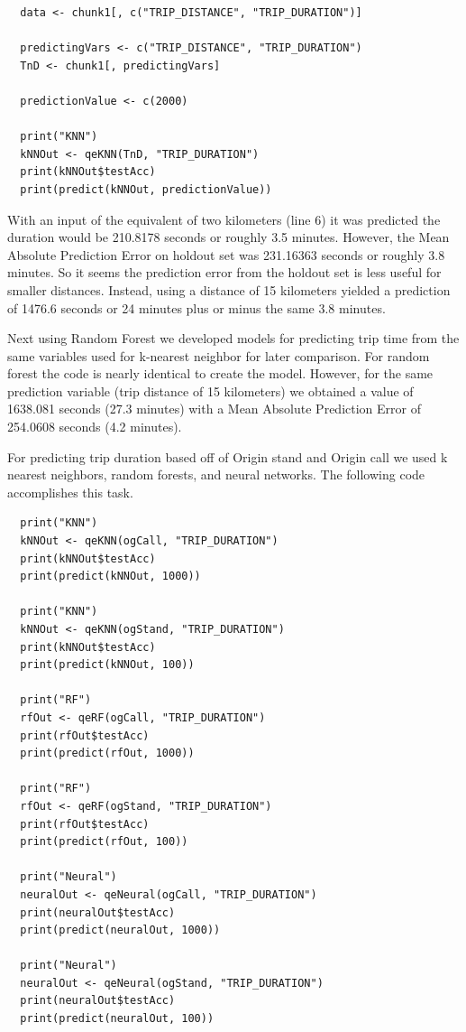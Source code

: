 \documentclass{article}
\numberwithin{equation}{section}
\begin{document}
\begin{lstlisting}
  data <- chunk1[, c("TRIP_DISTANCE", "TRIP_DURATION")]
  
  predictingVars <- c("TRIP_DISTANCE", "TRIP_DURATION")
  TnD <- chunk1[, predictingVars]

  predictionValue <- c(2000)
  
  print("KNN")
  kNNOut <- qeKNN(TnD, "TRIP_DURATION")
  print(kNNOut$testAcc)
  print(predict(kNNOut, predictionValue))
\end{lstlisting}  

With an input of the equivalent of two kilometers (line 6) it was predicted the duration would be 210.8178 seconds or roughly 3.5 minutes. However, the Mean Absolute Prediction Error on holdout set was 231.16363 seconds or roughly 3.8 minutes. So it seems the prediction error from the holdout set is less useful for smaller distances. Instead, using a distance of 15 kilometers yielded a prediction of 1476.6 seconds or 24 minutes plus or minus the same 3.8 minutes. 


Next using Random Forest we developed models for predicting trip time from the same variables used for k-nearest neighbor for later comparison. For random forest the code is nearly identical to create the model. However, for the same prediction variable (trip distance of 15 kilometers) we obtained a value of 1638.081 seconds (27.3 minutes) with a Mean Absolute Prediction Error of 254.0608 seconds (4.2 minutes). 
\\



\newpage

For predicting trip duration based off of Origin stand and Origin call we used k nearest neighbors, random forests, and neural networks.  The following code accomplishes this task.
\begin{lstlisting}
  print("KNN")
  kNNOut <- qeKNN(ogCall, "TRIP_DURATION")
  print(kNNOut$testAcc)
  print(predict(kNNOut, 1000))

  print("KNN")
  kNNOut <- qeKNN(ogStand, "TRIP_DURATION")
  print(kNNOut$testAcc)
  print(predict(kNNOut, 100))
  
  print("RF")
  rfOut <- qeRF(ogCall, "TRIP_DURATION")
  print(rfOut$testAcc)
  print(predict(rfOut, 1000))
  
  print("RF")
  rfOut <- qeRF(ogStand, "TRIP_DURATION")
  print(rfOut$testAcc)
  print(predict(rfOut, 100))
  
  print("Neural")
  neuralOut <- qeNeural(ogCall, "TRIP_DURATION")
  print(neuralOut$testAcc)
  print(predict(neuralOut, 1000))
  
  print("Neural")
  neuralOut <- qeNeural(ogStand, "TRIP_DURATION")
  print(neuralOut$testAcc)
  print(predict(neuralOut, 100))
\end{lstlisting}
\end{document}
